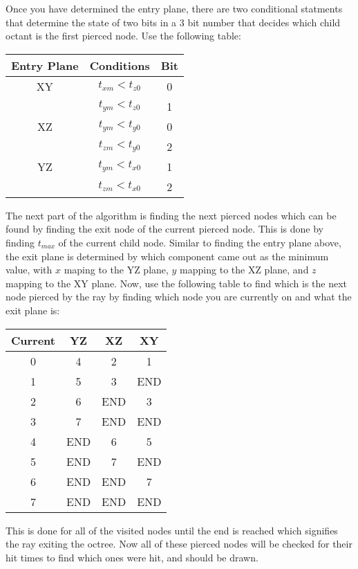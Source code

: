 Once you have determined the entry plane, there are two conditional statments that determine the state of two bits in a 3 bit number that decides which child octant is the first pierced node. Use the following table:\newline


\begin{tabular}{c|c|c}
  Entry Plane & Conditions & Bit \\
  \hline
  XY & $t_{xm} < t_{z0}$ & 0 \\
     & $t_{ym} < t_{z0}$ & 1 \\
  \hline
  XZ & $t_{ym} < t_{y0}$ & 0 \\
     & $t_{zm} < t_{y0}$ & 2 \\
  \hline
  YZ & $t_{ym} < t_{x0}$ & 1 \\
     & $t_{zm} < t_{x0}$ & 2 \\ \end{tabular}
  \newline

  The next part of the algorithm is finding the next pierced nodes which can be found by finding the exit node of the current pierced node. This is done by finding $t_{max}$ of the current child node. Similar to finding the entry plane above, the exit plane is determined by which component came out as the minimum value, with $x$ maping to the YZ plane, $y$ mapping to the XZ plane, and $z$ mapping to the XY plane. Now, use the following table to find which is the next node pierced by the ray by finding which node you are currently on and what the exit plane is: \newline

        \begin{tabular}{c|c|c|c}
        Current & YZ & XZ & XY \\
        \hline
        0 & 4 & 2 & 1 \\
        1 & 5 & 3 & END \\
        2 & 6 & END & 3 \\
        3 & 7 & END & END \\
        4 & END & 6 & 5 \\
        5 & END & 7 & END \\
        6 & END & END & 7 \\
        7 & END & END & END \\ \end{tabular} 
        \newline

This is done for all of the visited nodes until the end is reached which signifies the ray exiting the octree. Now all of these pierced nodes will be checked for their hit times to find which ones were hit, and should be drawn.

